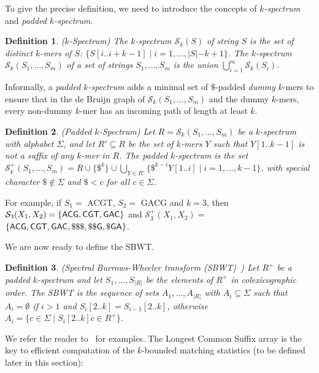 \documentclass[unnumsec,webpdf,contemporary,large]{oup-authoring-template}%
\theoremstyle{thmstyleone}%
\theoremstyle{thmstyletwo}%
\theoremstyle{thmstylethree}%
\newtheorem{definition}{Definition}
\begin{document}
To give the precise definition, we need to introduce the concepts of \emph{$k$-spectrum} and \emph{padded $k$-spectrum}.%

\begin{definition}($k$-Spectrum) The $k$-spectrum $\mathcal{S}_k(S)$ of string $S$ is the set of distinct $k$-mers of $S$: $\{S[i..i+k-1] \; | \; i = 1 , \ldots, |S|-k+1\}$.
%
The $k$-spectrum $\mathcal{S}_k(S_1, \ldots, S_m)$ of a set of strings $S_1, \ldots, S_m$ is the union $\bigcup_{i = 1}^m \mathcal{S}_k(S_i)$.
\end{definition}

\noindent Informally, a \emph{padded $k$-spectrum} adds a minimal set of $\$$-padded \emph{dummy} $k$-mers to ensure that in the de Bruijn graph of $\mathcal S_k(S_1, \ldots, S_m)$ and the dummy $k$-mers, every non-dummy $k$-mer has an incoming path of length at least $k$.

\begin{definition}\label{def:padded_k_spectrum} (Padded $k$-Spectrum)
Let $R = \mathcal{S}_k(S_1, \ldots, S_m)$ be a $k$-spectrum with alphabet $\Sigma$, and let $R' \subseteq R$ be the set of $k$-mers $Y$ such that $Y[1..k-1]$ is not a suffix of any $k$-mer in $R$. The padded $k$-spectrum is the set $\mathcal{S}_k^+(S_1, \ldots, S_m) = R \cup \{\$^k\} \cup \bigcup_{Y \in R'} \{\$^{k-i} Y[1..i] \; | \; i = 1, \ldots, k-1\}$, with special character $\$ \not\in \Sigma$ and $\$ < c$ for all $c \in \Sigma$.
\end{definition}
\noindent For example, if $S_1 = $ {\sf ACGT}, $S_2 = $ {\sf GACG} and $k=3$, then $\mathcal{S}_3(X_1, X_2) = \{ {\sf ACG }, {\sf CGT }, {\sf GAC }\}$ and $\mathcal{S}_3^+(X_1, X_2) = $ $\{{\sf ACG }, {\sf CGT}, {\sf GAC }, {\sf \$\$\$}, {\sf \$\$G}, {\sf \$GA} \}$.

We are now ready to define the SBWT.

\begin{definition}\label{def:SBWT}(Spectral Burrows-Wheeler transform (SBWT)~\cite{alanko2023small}) Let $R^+$ be a padded $k$-spectrum and let $S_1, \ldots, S_{|R|}$ be the elements of $R^+$ in colexicographic order. The SBWT is the sequence of sets $A_1, \ldots, A_{|R|}$ with $A_i \subseteq \Sigma$ such that $A_i = \emptyset$ if $i > 1$ and $S_i[2..k] = S_{i-1}[2..k]$, otherwise $A_i = \{c \in \Sigma \; | \; S_i[2..k]c \in R^+\}$.
\end{definition}
\noindent We refer the reader to~\cite{alanko2023longest, alanko2024finimizers, alanko2023small} for examples. The Longest Common Suffix array is the key to efficient computation of the $k$-bounded matching statistics (to be defined later in this section):
\end{document}

